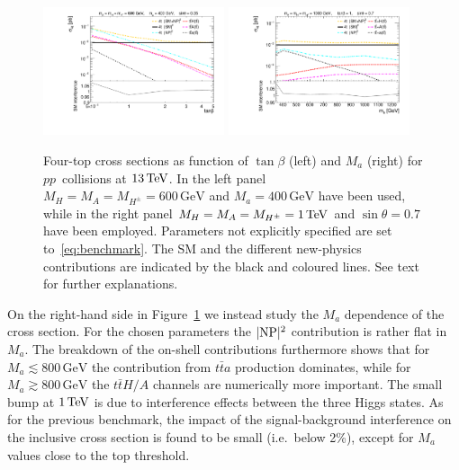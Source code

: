 \documentclass[review]{elsarticle}
\newcommand{\mA}{\ensuremath{M_{A}}\xspace}
\newcommand{\ma}{\ensuremath{M_{a}}\xspace}
\newcommand{\mH}{\ensuremath{M_{H}}\xspace}
\newcommand{\mHc}{\ensuremath{M_{H^{\pm}}}\xspace}
\begin{document}
 \begin{figure}[!t]
\centering
\includegraphics[width=0.475\textwidth]{plot_tb.pdf} \quad 
\includegraphics[width=0.475\textwidth]{plot_ma.pdf}
\vspace{4mm}
\caption{\label{fig:4top} Four-top cross sections as function of $\tan \beta$ (left) and $\ma$ (right) for $pp$~collisions at $13 \, {\rm TeV}$.   In the left panel $\mH =\mA=\mHc = 600 \, {\mathrm{GeV}}$ and  $\ma = 400 \, {\mathrm{GeV}}$ have been used, while in the right panel $\mH =\mA=\mHc = 1 \, {\rm TeV}$ and  $\sin \theta = 0.7$ have been employed. Parameters not explicitly specified are set to~\eqref{eq:benchmark}.  The SM and the different new-physics contributions are indicated by the black and coloured lines. See text for further explanations.}
\end{figure}

On the right-hand side in Figure~\ref{fig:4top} we instead  study the $\ma$ dependence of the cross section. For the chosen parameters the $|{\rm NP}|^2$ contribution is rather flat in $\ma$. The breakdown of the on-shell contributions furthermore shows that for $\ma \lesssim 800 \, {\mathrm{GeV}}$ the contribution from $t \bar t a$ production dominates, while for $\ma \gtrsim 800 \, {\mathrm{GeV}}$ the $t \bar t H/A$ channels are numerically more important. The small bump at $1 \, {\rm TeV}$ is due to interference effects between the three Higgs states.  As for the previous benchmark,  the impact of the signal-background interference on the inclusive cross section is found to be small (i.e.~below 2\%), except for $\ma$ values close to the top threshold. 
\end{document}
